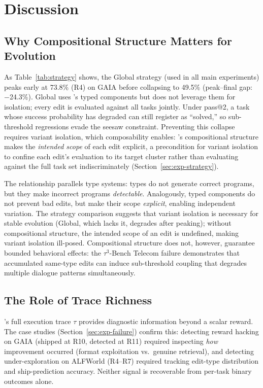 \section{Discussion}
\label{sec:discussion}

\subsection{Why Compositional Structure Matters for Evolution}

As Table~\ref{tab:strategy} shows, the Global strategy (used in all main experiments) peaks early at 73.8\% (R4) on GAIA before collapsing to 49.5\% (peak--final gap: $-$24.3\%). Global uses \ProjectName's typed components but does not leverage them for isolation; every edit is evaluated against all tasks jointly. Under pass@2, a task whose success probability has degraded can still register as ``solved,'' so sub-threshold regressions evade the seesaw constraint. Preventing this collapse requires variant isolation, which composability enables: \ProjectName's compositional structure makes the \emph{intended scope} of each edit explicit, a precondition for variant isolation to confine each edit's evaluation to its target cluster rather than evaluating against the full task set indiscriminately (Section~\ref{sec:exp-strategy}).

The relationship parallels type systems: types do not generate correct programs, but they make incorrect programs \emph{detectable}. Analogously, typed components do not prevent bad edits, but make their scope \emph{explicit}, enabling independent variation. The strategy comparison suggests that variant isolation is necessary for stable evolution (Global, which lacks it, degrades after peaking); without compositional structure, the intended scope of an edit is undefined, making variant isolation ill-posed. Compositional structure does not, however, guarantee bounded behavioral effects: the $\tau^3$-Bench Telecom failure demonstrates that accumulated same-type edits can induce sub-threshold coupling that degrades multiple dialogue patterns simultaneously.

\subsection{The Role of Trace Richness}

\ProjectName's full execution trace $\tau$ provides diagnostic information beyond a scalar reward. The case studies (Section~\ref{sec:exp-failure}) confirm this: detecting reward hacking on GAIA (shipped at R10, detected at R11) required inspecting \emph{how} improvement occurred (format exploitation vs.\ genuine retrieval), and detecting under-exploration on ALFWorld (R4--R7) required tracking edit-type distribution and ship-prediction accuracy. Neither signal is recoverable from per-task binary outcomes alone.

